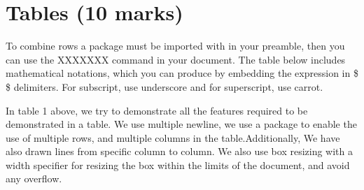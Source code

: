 \documentclass[a4paper,11pt]{article}
\begin{document}
\section{\textbf{Tables (10 marks)}}
%
To combine rows a package must be imported with in your preamble, then you can use the XXXXXXX command in your document. The table below includes mathematical notations, which you can produce by embedding the expression in \$ \$ delimiters. For subscript, use underscore and for superscript, use carrot.
\newline
\begin{table}[H]
\centering
{}
\caption{Table depicting the use of both multirow and multicolumn}
\end{table}
{\LARGE In table 1 above, we try to demonstrate all the features required to be demonstrated in a table.  We use multiple newline, we use a package to enable the use of multiple rows,  and multiple columns in the table.Additionally,  We have also drawn lines from specific column to column.   We also use box resizing with a width specifier for resizing the box within the limits of the document, and avoid any overflow.}
\pagebreak
\end{document}
